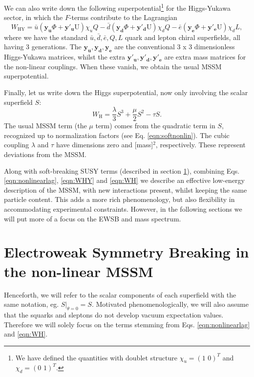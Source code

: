 We can also write down the following superpotential\footnote{We have defined the quantities with doublet structure $\chi_u=\left(1\,\,0\right)^{T}$ and $\chi_d=\left(0\,\,1\right)^{T}$.} for the Higgs-Yukawa sector, in which the $F$-terms contribute to the Lagrangian
\begin{equation}
	W_{\text{HY}}=\bar{u}\left(\mathbf{y_{u}}\Phi +\mathbf{y'_{u}}\text{U}\right)\chi_u Q 
	-\bar{d}\left(\mathbf{y_{d}}\Phi+\mathbf{y'_{d}}\text{U}\right)\chi_dQ
	-\bar{e}\left(\mathbf{y_{e}}\Phi+\mathbf{y'_{e}}\text{U}\right)\chi_d L,
    \label{eqn:WHY}
\end{equation}
where we have the standard $\bar{u},\bar{d},\bar{e},Q,L$ quark and lepton chiral superfields, all having 3 generations. The $\mathbf{y_u,y_d,y_e}$ are the conventional 3 x 3 dimensionless Higgs-Yukawa matrices, whilst the extra $\mathbf{y'_u,y'_d,y'_e}$ are extra mass matrices for the non-linear couplings. When these vanish, we obtain the usual MSSM superpotential.

Finally, let us write down the Higgs superpotential, now only involving the scalar superfield $S$:
\begin{equation}
W_{\text{H}}= \frac{\lambda}{3}S^{3}+\frac{\mu}{2}S^{2}-\tau S \label{eqn:WH}.
\end{equation}
The usual MSSM term (the $\mu$ term) comes from the quadratic term in $S$, recognized up to normalization factors (see Eq. \ref{eqn:softnonlin}). The cubic coupling $\lambda$ and $\tau$ have dimensions zero and [mass]$^2$, respectively. These represent deviations from the MSSM.

Along with soft-breaking SUSY terms (described in section \ref{sec:EWSBnonlin}), combining Eqs. \ref{eqn:nonlinearlag}, \ref{eqn:WHY} and \ref{eqn:WH} we describe an effective low-energy description of the MSSM, with new interactions present, whilst keeping the same particle content. This adds a more rich phenomenology, but also flexibility in accommodating experimental constraints. However, in the following sections we will put more of a focus on the EWSB and mass spectrum.

\section{Electroweak Symmetry Breaking in the non-linear MSSM}
\label{sec:EWSBnonlin}

Henceforth, we will refer to the scalar components of each superfield with the same notation, eg. $S|_{\theta=0}=S$. Motivated phenomenologically, we will also assume that the squarks and sleptons do not develop vacuum expectation values. Therefore we will solely focus on the terms stemming from Eqs. \ref{eqn:nonlinearlag} and \ref{eqn:WH}.

